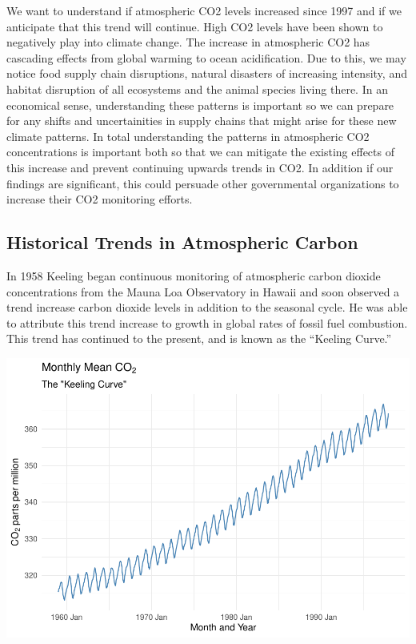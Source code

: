\documentclass[AER]{AEA}
\begin{document}
We want to understand if atmospheric CO2 levels increased since 1997 and
if we anticipate that this trend will continue. High CO2 levels have
been shown to negatively play into climate change. The increase in
atmospheric CO2 has cascading effects from global warming to ocean
acidification. Due to this, we may notice food supply chain disruptions,
natural disasters of increasing intensity, and habitat disruption of all
ecosystems and the animal species living there. In an economical sense,
understanding these patterns is important so we can prepare for any
shifts and uncertainities in supply chains that might arise for these
new climate patterns. In total understanding the patterns in atmospheric
CO2 concentrations is important both so that we can mitigate the
existing effects of this increase and prevent continuing upwards trends
in CO2. In addition if our findings are significant, this could persuade
other governmental organizations to increase their CO2 monitoring
efforts.

\hypertarget{historical-trends-in-atmospheric-carbon}{%
\subsection{Historical Trends in Atmospheric
Carbon}\label{historical-trends-in-atmospheric-carbon}}

In 1958 Keeling began continuous monitoring of atmospheric carbon
dioxide concentrations from the Mauna Loa Observatory in Hawaii and soon
observed a trend increase carbon dioxide levels in addition to the
seasonal cycle. He was able to attribute this trend increase to growth
in global rates of fossil fuel combustion. This trend has continued to
the present, and is known as the ``Keeling Curve.''

\includegraphics{Lab2_Group_report_files/figure-latex/plot the keeling curve-1.pdf}
\end{document}
